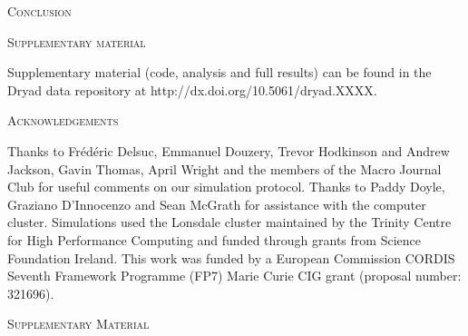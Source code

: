 \documentclass[12pt,letterpaper]{article}
\renewcommand{\section}[1]{%
\bigskip
\begin{center}
\begin{Large}
\normalfont\scshape #1
\medskip
\end{Large}
\end{center}}
\begin{document}
%
%

\section{Conclusion} %



%
%
\section{Supplementary material}
Supplementary material (code, analysis and full results) can be found in the Dryad data repository at http://dx.doi.org/10.5061/dryad.XXXX. %

\section{Acknowledgements}
Thanks to Fr\'{e}d\'{e}ric Delsuc, Emmanuel Douzery, Trevor Hodkinson and Andrew Jackson, Gavin Thomas, April Wright and the members of the Macro Journal Club %
for useful comments on our simulation protocol. Thanks to Paddy Doyle, Graziano D'Innocenzo and Sean McGrath for assistance with the computer cluster. Simulations used the Lonsdale cluster maintained by the Trinity Centre for High Performance Computing and funded through grants from Science Foundation Ireland. This work was funded by a European Commission CORDIS Seventh Framework Programme (FP7) Marie Curie CIG grant (proposal number: 321696).





\section{Supplementary Material}

    
    \label{SupplementaryMaterial}

\end{document}
